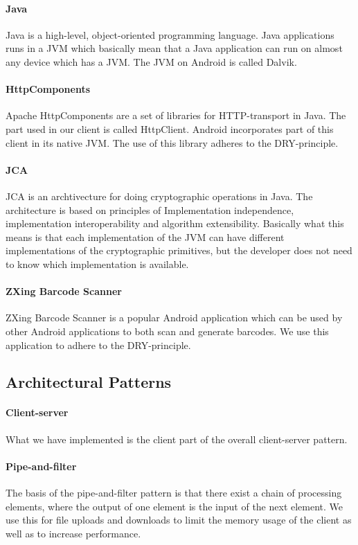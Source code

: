 \documentclass[pdftex,english,10pt,b5paper,twoside]{book}
\begin{document}
\paragraph{Java} Java is a high-level, object-oriented programming language.
Java applications runs in a \ac{JVM} which basically mean that a Java
application can run on  almost any device which has a \ac{JVM}. The \ac{JVM} on
Android is called Dalvik.

\paragraph{HttpComponents} Apache HttpComponents are a set of libraries for
HTTP-transport in Java. The part used in our client is called HttpClient.
Android incorporates part of this client in its native \ac{JVM}. The use of
this library adheres to the \ac{DRY}-principle.

\paragraph{\ac{JCA}}\ac{JCA} is an archtivecture for doing cryptographic
operations in Java. The architecture is based on principles of Implementation
independence, implementation interoperability and algorithm extensibility.
Basically what this means is that each implementation of the \ac{JVM} can have
different implementations of the cryptographic primitives, but the developer
does not need to know which implementation is available.

\paragraph{ZXing Barcode Scanner} ZXing Barcode Scanner is a popular Android
application which can be used by other Android applications to both scan and
generate barcodes. We use this application to adhere to the \ac{DRY}-principle. 

\subsection{Architectural Patterns}

\paragraph{Client-server} What we have implemented is the client part of the
overall client-server pattern.

\paragraph{Pipe-and-filter} The basis of the pipe-and-filter pattern is that
there exist a chain of processing elements, where the output of one element is
the input of the next element. We use this for file uploads and downloads to
limit the memory usage of the client as well as to increase performance.
\end{document}
